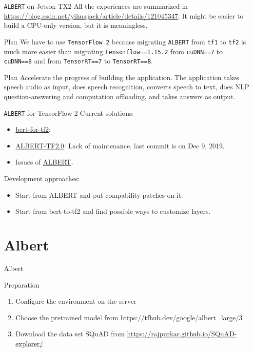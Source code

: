 \documentclass[12pt]{beamer}
\begin{document}
\begin{frame}{\texttt{ALBERT} on Jetson TX2}
All the experiences are summarized in \url{https://blog.csdn.net/yihuajack/article/details/121045347}. It might be easier to build a CPU-only version, but it is meaningless.
\begin{block}{Plan}
We have to use \texttt{TensorFlow 2} because migrating \texttt{ALBERT} from \texttt{tf1} to \texttt{tf2} is much more easier than migrating \texttt{tensorflow==1.15.2} from \texttt{cuDNN==7} to \texttt{cuDNN==8} and from \texttt{TensorRT==7} to \texttt{TensorRT==8}.
\end{block}
\begin{block}{Plan}
Accelerate the progress of building the application. The application takes speech audio as input, does speech recognition, converts speech to text, does NLP question-answering and computation offloading, and takes answers as output.
\end{block}
\end{frame}

\begin{frame}{\texttt{ALBERT} for TensorFlow 2}
Current solutions:
\begin{itemize}
    \item \href{https://github.com/kpe/bert-for-tf2}{bert-for-tf2}: 
    \item \href{https://github.com/kamalkraj/ALBERT-TF2.0}{ALBERT-TF2.0}: Lack of maintenance, last commit is on Dec 9, 2019.
    \item Issues of \href{https://github.com/google-research/albert}{ALBERT}.
\end{itemize}
Development approaches:
\begin{itemize}
    \item Start from ALBERT and put compability patches on it.
    \item Start from bert-to-tf2 and find possible ways to customize layers.
\end{itemize}
\end{frame}

\section{Albert}
\begin{frame}{Albert}
    \begin{block}{Preparation}
    \begin{enumerate}
        \item Configure the environment on the server
        \item Choose the pretrained model from \url{https://tfhub.dev/google/albert_large/3}
        \item Download the data set SQuAD from \url{https://rajpurkar.github.io/SQuAD-explorer/}
    \end{enumerate}
    \end{block}
\end{frame}
\end{document}
